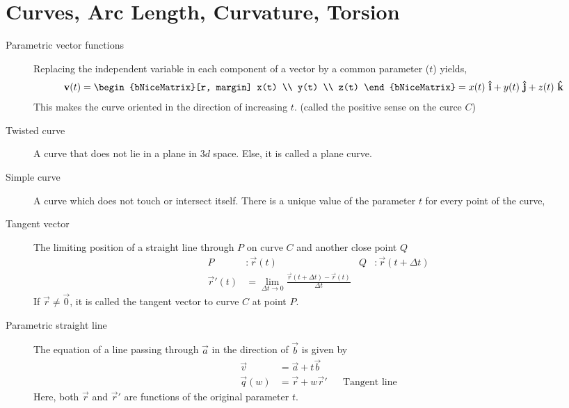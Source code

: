 \section{Curves, Arc Length, Curvature, Torsion}

\begin{description}
    \item[Parametric vector functions] Replacing the independent variable in each
        component of a vector by a common parameter ($ t $) yields,
        \begin{align}
            \vec{v}(t) & =
            \begin{bNiceMatrix}[r, margin]
                x(t) \\ y(t) \\ z(t)
            \end{bNiceMatrix}
            = x(t)\ \vec{\hat{i}} + y(t)\ \vec{\hat{j}} + z(t)\ \vec{\hat{k}}
        \end{align}
        This makes the curve oriented in the direction of increasing $ t $. (called the
        positive sense on the curce $ C $)

    \item[Twisted curve] A curve that does not lie in a plane in $ 3d $ space. Else, it
        is called a plane curve.

    \item[Simple curve] A curve which does not touch or intersect itself. There is a
        unique value of the parameter $ t $ for every point of the curve,

    \item[Tangent vector] The limiting position of a straight line through $ P $ on
        curve $ C $ and another close point $ Q $
        \begin{align}
            P           & : \vec{r}(t)                    &
            Q           & : \vec{r}(t + \Delta t)           \\
            \vec{r}'(t) & = \lim_{\Delta t \rightarrow 0}
            \frac{\vec{r}(t + \Delta t) - \vec{r}(t)}{\Delta t}
        \end{align}
        If $ \vec{r} \neq \vec{0} $, it is called the tangent vector to curve $ C $ at
        point $ P $.

    \item[Parametric straight line] The equation of a line passing through $ \vec{a} $
        in the direction of $ \vec{b} $ is given by
        \begin{align}
            \vec{v}    & = \vec{a} + t\vec{b}                           \\
            \vec{q}(w) & = \vec{r} + w\vec{r}' &  & \text{Tangent line}
        \end{align}
        Here, both $ \vec{r} $ and $ \vec{r}' $ are functions of the original parameter
        $ t $.


\end{description}

